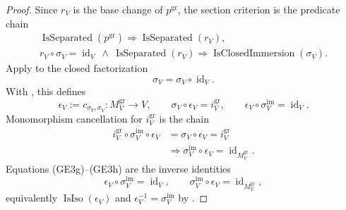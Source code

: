 \begin{proof}
  Since $r_V$ is the base change of $p^{\mathrm{gr}}$, the section criterion
  is the predicate chain
  \[
  \begin{gathered}
    \operatorname{IsSeparated}(p^{\mathrm{gr}})
      \Longrightarrow\operatorname{IsSeparated}(r_V),\\
    r_V\circ\sigma_V=\operatorname{id}_V
      \ \wedge\ \operatorname{IsSeparated}(r_V)
      \Longrightarrow\operatorname{IsClosedImmersion}(\sigma_V).
  \end{gathered}                                                   \tag{GE3f}
  \]
  Apply  to the closed
  factorization
  \[
    \sigma_V=\sigma_V\circ\operatorname{id}_V.
  \]
  With , this defines
  \[
    \epsilon_V:=c_{\sigma_V,\sigma_V}\colon M_V^{\mathrm{gr}}\to V,
    \qquad
    \sigma_V\circ\epsilon_V=i_V^{\mathrm{gr}},\qquad
    \epsilon_V\circ\sigma_V^{\mathrm{im}}=\operatorname{id}_V. \tag{GE3g}
  \]
  Monomorphism cancellation for $i_V^{\mathrm{gr}}$ is the chain
  \[
  \begin{aligned}
    i_V^{\mathrm{gr}}\circ\sigma_V^{\mathrm{im}}\circ\epsilon_V
      &=\sigma_V\circ\epsilon_V=i_V^{\mathrm{gr}}\\
    &\Longrightarrow
      \sigma_V^{\mathrm{im}}\circ\epsilon_V
        =\operatorname{id}_{M_V^{\mathrm{gr}}}.
  \end{aligned}                                                  \tag{GE3h}
  \]
  Equations (GE3g)--(GE3h) are the inverse identities
  \[
    \epsilon_V\circ\sigma_V^{\mathrm{im}}=\operatorname{id}_V,
    \qquad
    \sigma_V^{\mathrm{im}}\circ\epsilon_V
      =\operatorname{id}_{M_V^{\mathrm{gr}}},
  \]
  equivalently
  $\operatorname{IsIso}(\epsilon_V)$ and
  $\epsilon_V^{-1}=\sigma_V^{\mathrm{im}}$ by
  .


\end{proof}
